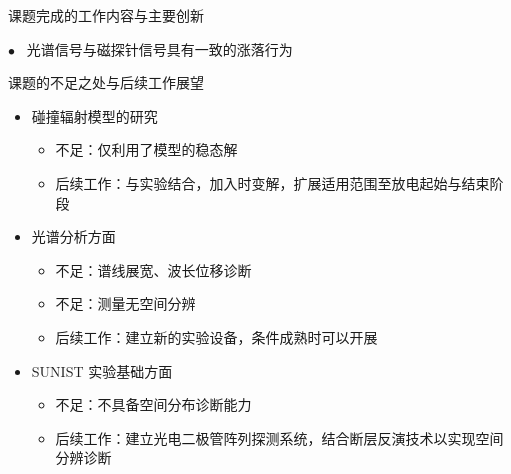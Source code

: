 \begin{CJK*}{UTF8}{kai}
\begin{frame}{课题完成的工作内容与主要创新}
\begin{itemize}
\begin{itemize}
\begin{itemize}
{							{\color{bulletcolor}\quad\tiny{}\hbox{{$\bullet$}}}~ 光谱信号与磁探针信号具有一致的涨落行为
						}
					\end{itemize}
			\end{itemize}
	\end{itemize}
\end{frame}

\begin{frame}{课题的不足之处与后续工作展望}
	\begin{itemize}
		\item 碰撞辐射模型的研究
			\begin{itemize}
				\item 不足：仅利用了模型的稳态解
				\item 后续工作：与实验结合，加入时变解，扩展适用范围至放电起始与结束阶段
			\end{itemize}
		\bigskip
		\item 光谱分析方面
			\begin{itemize}
				\item 不足：谱线展宽、波长位移诊断
				\item 不足：测量无空间分辨
				\item 后续工作：建立新的实验设备，条件成熟时可以开展
			\end{itemize}
		\bigskip
		\item SUNIST 实验基础方面
			\begin{itemize}
				\item 不足：不具备空间分布诊断能力
				\item 后续工作：建立光电二极管阵列探测系统，结合断层反演技术以实现空间分辨诊断%
			\end{itemize}
	\end{itemize}
\end{frame}


\end{CJK*}

